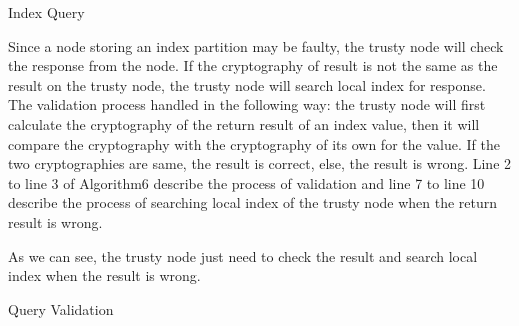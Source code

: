 \LinesNumbered
\vspace{-0.5cm}
\begin{algorithm}[htb]
	\SetAlgoLined
	\caption{Index Query}%
	
\end{algorithm}


Since a node storing an index partition may be faulty, the trusty node will check the response from the node. If the cryptography of result is not the same as the result on the trusty node, the trusty node will search local index for
response. The validation process handled in the following way: the trusty node will first calculate the cryptography of
the return result of an index value, then it will compare the cryptography with the cryptography of its own for the value.
If the two cryptographies are same, the result is correct, else, the result is wrong. Line 2 to line 3 of Algorithm6 describe
the process of validation and line 7 to line 10 describe the process of searching local index of the trusty node when the
return result is wrong.
 
As we can see, the trusty node just need to check the result and search local index when the result is wrong.


\LinesNumbered
\vspace{-0.5cm}
\begin{algorithm}[htb]
	\SetAlgoLined
	\caption{Query Validation}%
	
\end{algorithm}